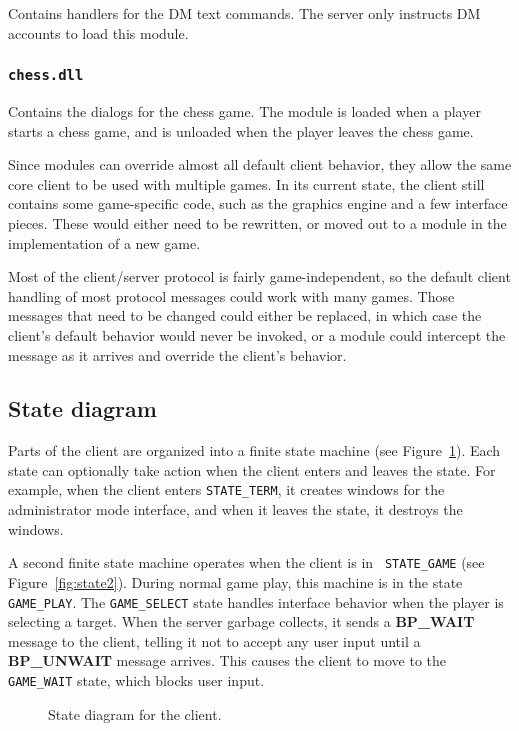 Contains handlers for the DM text commands.  The server only instructs
DM accounts to load this module.

\subsubsection{{\tt chess.dll}}

Contains the dialogs for the chess game.  The module is loaded when a
player starts a chess game, and is unloaded when the player leaves the
chess game.


Since modules can override almost all default client behavior, they
allow the same core client to be used with multiple games.  In its
current state, the client still contains some game-specific code, such
as the graphics engine and a few interface pieces.  These would either
need to be rewritten, or moved out to a module in the implementation
of a new game.

Most of the client/server protocol is fairly game-independent, so the
default client handling of most protocol messages could work with many
games.  Those messages that need to be changed could either be
replaced, in which case the client's default behavior would never be
invoked, or a module could intercept the message as it arrives and
override the client's behavior.

\subsection{State diagram}
\label{sec:clistate}

Parts of the client are organized into a finite state machine (see
Figure~\ref{fig:state1}).  Each state can optionally take action when
the client enters and leaves the state.  For example, when the client
enters {\tt STATE\_TERM}, it creates windows for the administrator
mode interface, and when it leaves the state, it destroys the windows.

A second finite state machine operates when the client is in {\tt
STATE\_GAME} (see Figure~\ref{fig:state2}).  During normal game play,
this machine is in the state {\tt GAME\_PLAY}.  The {\tt GAME\_SELECT}
state handles interface behavior when the player is selecting a
target.  When the server garbage collects, it sends a {\bf BP\_WAIT}
message to the client, telling it not to accept any user input until a
{\bf BP\_UNWAIT} message arrives.  This causes the client to move to
the {\tt GAME\_WAIT} state, which blocks user input.

\begin{figure}
\caption{State diagram for the client.}
\label{fig:state1}
\end{figure}


